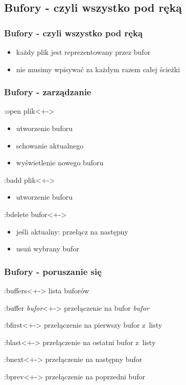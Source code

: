 \documentclass{beamer}
\begin{document}
\subsection{Bufory - czyli wszystko pod ręką}
\begin{frame}
	\frametitle{Bufory - czyli wszystko pod ręką}
	\begin{itemize}[<+->]
		\item każdy plik jest reprezentowany przez bufor
		\item nie musimy wpisywać za każdym razem całej ścieżki
	\end{itemize}
\end{frame}
\begin{frame}
	\frametitle{Bufory - zarządzanie}
	\begin{block}{:open plik}<+->
		\begin{itemize}
			\item utworzenie buforu
			\item schowanie aktualnego
			\item wyświetlenie nowego buforu
		\end{itemize}
	\end{block}
	\begin{block}{:badd plik}<+->
		\begin{itemize}
			\item utworzenie buforu
		\end{itemize}
	\end{block}
	\begin{block}{:bdelete bufor}<+->
		\begin{itemize}
			\item jeśli aktualny: przełącz na następny
			\item usuń wybrany bufor
		\end{itemize}
	\end{block}
\end{frame}
\begin{frame}
	\frametitle{Bufory - poruszanie się}
	\begin{block}{:buffers}<+->
		lista buforów
	\end{block}
	\begin{block}{:buffer \textit{bufor}}<+->
		przełączenie na bufor \textit{bufor}
	\end{block}
	\begin{block}{:bfirst}<+->
		przełączenie na pierwszy bufor z~listy
	\end{block}
	\begin{block}{:blast}<+->
		przełączenie na ostatni bufor z~listy
	\end{block}
\end{frame}
\begin{frame}
	\begin{block}{:bnext}<+->
		przełączenie na następny bufor
	\end{block}
	\begin{block}{:bprev}<+->
		przełączenie na poprzedni bufor
	\end{block}
\end{frame}
\end{document}
